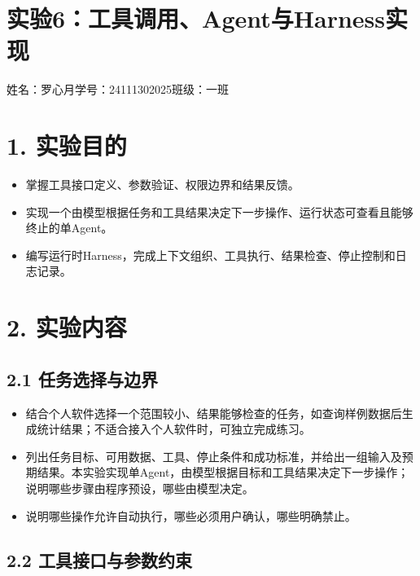 \documentclass[UTF8,12pt,a4paper]{ctexart}
\def\thelstlisting{6-\arabic{lstlisting}}
\begin{document}
\renewcommand{\thelstlisting}{6-\arabic{lstlisting}}

\section*{实验6：工具调用、Agent与Harness实现}

\begin{center}
姓名：罗心月\qquad 学号：24111302025\qquad 班级：一班
\end{center}

\section*{1. 实验目的}

\begin{itemize}
  \item 掌握工具接口定义、参数验证、权限边界和结果反馈。
  \item 实现一个由模型根据任务和工具结果决定下一步操作、运行状态可查看且能够终止的单Agent。
  \item 编写运行时Harness，完成上下文组织、工具执行、结果检查、停止控制和日志记录。
\end{itemize}

\section*{2. 实验内容}

\subsection*{2.1 任务选择与边界}

\begin{itemize}
  \item 结合个人软件选择一个范围较小、结果能够检查的任务，如查询样例数据后生成统计结果；不适合接入个人软件时，可独立完成练习。
  \item 列出任务目标、可用数据、工具、停止条件和成功标准，并给出一组输入及预期结果。本实验实现单Agent，由模型根据目标和工具结果决定下一步操作；说明哪些步骤由程序预设，哪些由模型决定。
  \item 说明哪些操作允许自动执行，哪些必须用户确认，哪些明确禁止。
\end{itemize}

\subsection*{2.2 工具接口与参数约束}
\end{document}
